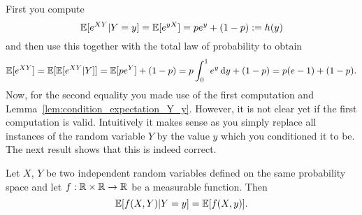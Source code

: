 First you compute
\[
	\mathbb E[e^{XY} | Y = y] = \mathbb E[e^{yX}] = pe^{y} + (1-p) := h(y)
\]
and then use this together with the total law of probability to obtain
\[
	\mathbb E[e^{XY}] = \mathbb E[\mathbb E[e^{XY}|Y]] = \mathbb E[pe^Y] + (1-p) = p \int_0^1 e^{y} \, \mathrm{d} y + (1-p)
	= p(e - 1) + (1-p).
\]
Now, for the second equality you made use of the first computation and Lemma~\ref{lem:condition_expectation_Y_y}. However, it is not clear yet if the first computation is valid. Intuitively it makes sense as you simply replace all instances of the random variable $Y$ by the value $y$ which you conditioned it to be. The next result shows that this is indeed correct.

\begin{lemma}\label{lem:computing_conditional_expectations}
Let $X$, $Y$ be two independent random variables defined on the same probability space and let $f : \mathbb R \times \mathbb R \to \mathbb R$ be a measurable function. Then
\[
	\mathbb E[f(X,Y) | Y = y] = \mathbb E[f(X,y)].
\]
\end{lemma}


